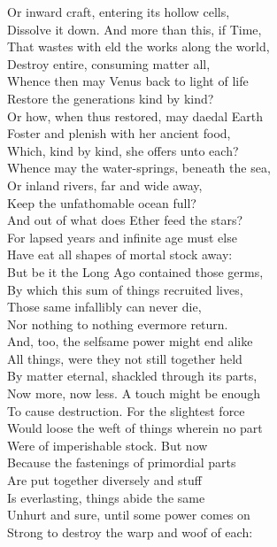 Or inward craft, entering its hollow cells,\\
Dissolve it down. And more than this, if Time,\\
That wastes with eld the works along the world,\\
Destroy entire, consuming matter all,\\
Whence then may Venus back to light of life\\
Restore the generations kind by kind?\\
Or how, when thus restored, may daedal Earth\\
Foster and plenish with her ancient food,\\
Which, kind by kind, she offers unto each?\\
Whence may the water-springs, beneath the sea,\\
Or inland rivers, far and wide away,\\
Keep the unfathomable ocean full?\\
And out of what does Ether feed the stars?\\
For lapsed years and infinite age must else\\
Have eat all shapes of mortal stock away:\\
But be it the Long Ago contained those germs,\\
By which this sum of things recruited lives,\\
Those same infallibly can never die,\\
Nor nothing to nothing evermore return.\\
And, too, the selfsame power might end alike\\
All things, were they not still together held\\
By matter eternal, shackled through its parts,\\
Now more, now less. A touch might be enough\\
To cause destruction. For the slightest force\\
Would loose the weft of things wherein no part\\
Were of imperishable stock. But now\\
Because the fastenings of primordial parts\\
Are put together diversely and stuff\\
Is everlasting, things abide the same\\
Unhurt and sure, until some power comes on\\
Strong to destroy the warp and woof of each:\\

